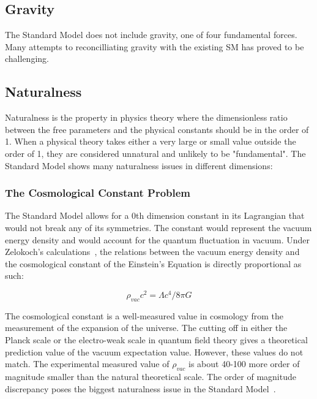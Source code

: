 \subsection{Gravity}
The Standard Model does not include gravity, one of four fundamental forces. Many attempts to reconcilliating gravity with the existing SM has proved to be challenging\cite{sep-quantum-gravity}.

\subsection{Naturalness}
Naturalness is the property in physics theory where the dimensionless ratio between the free parameters and the physical constants should be in the order of 1. When a physical theory takes either a very large or small value outside the order of 1, they are considered unnatural and unlikely to be "fundamental". 
The Standard Model shows many naturalness issues in different dimensions: 

\subsubsection{The Cosmological Constant Problem}
The Standard Model allows for a 0th dimension constant in its Lagrangian that would not break any of its symmetries. The constant would represent the vacuum energy density and would account for the quantum fluctuation in vacuum. Under Zelokoch's calculations~\cite{zel1968cosmological}, the relations between the vacuum energy density and the cosmological constant of the Einstein's Equation is directly proportional as such:

\begin{equation}
    \rho_{vac}c^2=\Lambda c^4/8\pi G
\label{eq:cosmoconst}
\end{equation}

The cosmological constant is a well-measured value in cosmology from the measurement of the expansion of the universe. The cutting off in either the Planck scale or the electro-weak scale in quantum field theory gives a theoretical prediction value of the vacuum expectation value. However, these values do not match. The experimental measured value of $\rho_{vac}$ is about 40-100 more order of magnitude smaller than the natural theoretical scale. The order of magnitude discrepancy poses the
biggest naturalness issue in the Standard Model~\cite{V2002}.



